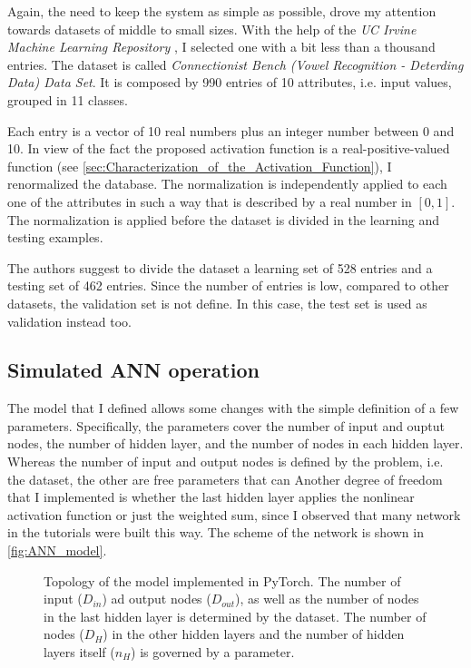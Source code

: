 Again, the need to keep the system as simple as possible, drove my attention towards datasets of middle to small sizes.
With the help of the \textit{UC Irvine Machine Learning Repository} \cite{UCIMLR}, I selected one with a bit less than a thousand entries.
The dataset is called \textit{Connectionist Bench (Vowel Recognition - Deterding Data) Data Set}.
It is composed by \num{990} entries of \num{10} attributes, i.e. input values, grouped in \num{11} classes.

Each entry is a vector of \num{10} real numbers plus an integer number between \num{0} and \num{10}.
In view of the fact the proposed activation function is a real-positive-valued function (see \autoref{sec:Characterization_of_the_Activation_Function}), I renormalized the database.
The normalization is independently applied to each one of the attributes in such a way that is described by a real number in $[0,1]$.
The normalization is applied before the dataset is divided in the learning and testing examples.

The authors suggest to divide the dataset a learning set of \num{528} entries and a testing set of \num{462} entries.
Since the number of entries is low, compared to other datasets, the validation set is not define.
In this case, the test set is used as validation instead too.

\subsection{Simulated ANN operation}
\label{ssec:Simulated_ANN_operation}
The model that I defined allows some changes with the simple definition of a few parameters.
Specifically, the parameters cover the number of input and ouptut nodes, the number of hidden layer, and the number of nodes in each hidden layer.
Whereas the number of input and output nodes is defined by the problem, i.e. the dataset, the other are free parameters that can
Another degree of freedom that I implemented is whether the last hidden layer applies the nonlinear activation function or just the weighted sum, since I observed that many network in the tutorials were built this way.
The scheme of the network is shown in \autoref{fig:ANN_model}.

\begin{figure}[htbp]
	\centering
	
	\caption{Topology of the model implemented in PyTorch. The number of input ($D_{in}$) ad output nodes ($D_{out}$), as well as the number of nodes in the last hidden layer is determined by the dataset.
	The number of nodes ($D_{H}$) in the other hidden layers and the number of hidden layers itself ($n_{H}$) is governed by a parameter.}
	\label{fig:ANN_model}
\end{figure}

